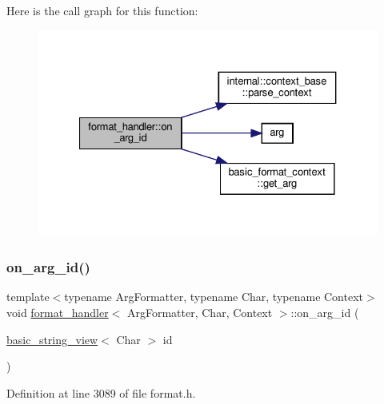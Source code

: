 Here is the call graph for this function\+:
\nopagebreak
\begin{figure}[H]
\begin{center}
\leavevmode
\includegraphics[width=327pt]{structformat__handler_a7af75f0c8c9bfd281525c23c557610df_cgraph}
\end{center}
\end{figure}
\mbox{\label{structformat__handler_a5030233b6e1cb1824e131712a3ec5156}} 
\subsubsection{\texorpdfstring{on\+\_\+arg\+\_\+id()}{on\_arg\_id()}\hspace{0.1cm}{\footnotesize\ttfamily [3/3]}}
{\footnotesize\ttfamily template$<$typename Arg\+Formatter, typename Char, typename Context$>$ \\
void \hyperlink{structformat__handler}{format\+\_\+handler}$<$ Arg\+Formatter, Char, Context $>$\+::on\+\_\+arg\+\_\+id (\begin{DoxyParamCaption}\item[{\hyperlink{classbasic__string__view}{basic\+\_\+string\+\_\+view}$<$ Char $>$}]{id }\end{DoxyParamCaption})\hspace{0.3cm}{\ttfamily [inline]}}



Definition at line 3089 of file format.\+h.

